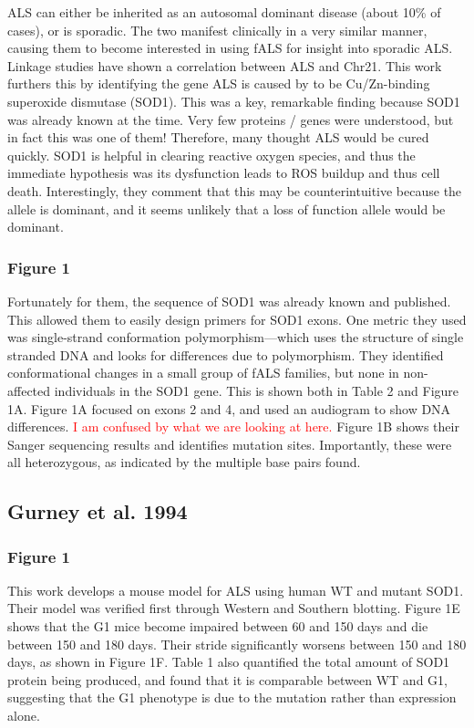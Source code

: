 ALS can either be inherited as an autosomal dominant disease (about 10\% of cases), or is sporadic. The two manifest clinically in a very similar manner, causing them to become interested in using fALS for insight into sporadic ALS. Linkage studies have shown a correlation between ALS and Chr21. This work furthers this by identifying the gene ALS is caused by to be Cu/Zn-binding superoxide dismutase (SOD1). This was a key, remarkable finding because SOD1 was already known at the time. Very few proteins / genes were understood, but in fact this was one of them! Therefore, many thought ALS would be cured quickly. SOD1 is helpful in clearing reactive oxygen species, and thus the immediate hypothesis was its dysfunction leads to ROS buildup and thus cell death. Interestingly, they comment that this may be counterintuitive because the allele is dominant, and it seems unlikely that a loss of function allele would be dominant. \newline

\subsubsection*{Figure 1}

Fortunately for them, the sequence of SOD1 was already known and published. This allowed them to easily design primers for SOD1 exons. One metric they used was single-strand conformation polymorphism---which uses the structure of single stranded DNA and looks for differences due to polymorphism. They identified conformational changes in a small group of fALS families, but none in non-affected individuals in the SOD1 gene. This is shown both in Table 2 and Figure 1A. Figure 1A focused on exons 2 and 4, and used an audiogram to show DNA differences. \textcolor{red}{I am confused by what we are looking at here.} Figure 1B shows their Sanger sequencing results and identifies mutation sites. Importantly, these were all heterozygous, as indicated by the multiple base pairs found.\newline

\subsection*{Gurney et al. 1994}

\subsubsection*{Figure 1}

This work develops a mouse model for ALS using human WT and mutant SOD1. Their model was verified first through Western and Southern blotting. Figure 1E shows that the G1 mice become impaired between 60 and 150 days and die between 150 and 180 days. Their stride significantly worsens between 150 and 180 days, as shown in Figure 1F. Table 1 also quantified the total amount of SOD1 protein being produced, and found that it is comparable between WT and G1, suggesting that the G1 phenotype is due to the mutation rather than expression alone.  

